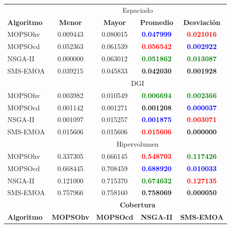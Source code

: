       \clearpage
      \newpage
 

\begin{table}
 \begin{center}
  \begin{tabular}{|l|cc|cc|} \hline
    & \multicolumn{4}{|c|}{Espaciado} \\ 
	\textbf{Algoritmo} & \textbf{Menor} & \textbf{Mayor} & \textbf{Promedio} & \textbf{Desviaci\'on} \\  \hline \hline
	MOPSOhv &0.009443 & 0.080015 & \textbf{\textcolor{blue}{ 0.047999}} & \textbf{\textcolor{red}{ 0.021016}}    \\ 
	MOPSOcd &0.052363 & 0.061539 & \textbf{\textcolor{red}{ 0.056542}} & \textbf{\textcolor{blue}{ 0.002922}}  \\ 
	NSGA-II &0.000000 & 0.063012 &  \textbf{\textcolor{green}{0.051862}} & \textbf{\textcolor{green}{ 0.013087}}   \\  
	SMS-EMOA & 0.039215 & 0.045833 & \textbf{0.042030} & \textbf{ 0.001928}   \\  
	\hline\hline
    & \multicolumn{4}{|c|}{DGI} \\ 
	\hline\hline
	MOPSOhv &0.003982 & 0.010549 &  \textbf{\textcolor{green}{0.006694}} &  \textbf{\textcolor{green}{0.002366}}   \\ 
	MOPSOcd &0.001142 & 0.001271 & \textbf{0.001208} & \textbf{\textcolor{blue}{ 0.000037}} \\ 
	NSGA-II &0.001097 & 0.015257 &  \textbf{\textcolor{blue}{0.001875}} & \textbf{\textcolor{red}{ 0.003071}}   \\  
	SMS-EMOA &0.015606 & 0.015606 & \textbf{\textcolor{red}{0.015606}} &  \textbf{0.000000}   \\  
	\hline\hline
    & \multicolumn{4}{|c|}{Hipervolumen} \\ 
	\hline \hline
	MOPSOhv &0.337305 & 0.666145 &  \textbf{\textcolor{red}{0.548703}} & \textbf{\textcolor{green}{0.117426}} \\ 
	MOPSOcd &0.668445 & 0.708459 &  \textbf{\textcolor{blue}{0.688920}} & \textbf{\textcolor{blue}{ 0.010033}}  \\ 
	NSGA-II &0.121000 & 0.715370 & \textbf{\textcolor{green}{ 0.674632}} & \textbf{\textcolor{red}{ 0.127135}}  \\  
	SMS-EMOA &0.757966 & 0.758160 &\textbf{ 0.758069} & \textbf{0.000050}   \\  
	\hline\hline
	& \multicolumn{4}{|c|}{\textbf{Cobertura}} \\ \hline\hline 
	\textbf{Algoritmo} & \textbf{MOPSOhv} & \textbf{MOPSOcd} & \textbf{NSGA-II} & \textbf{SMS-EMOA} \\  \hline \hline

\end{tabular}
\end{center}
\end{table}
